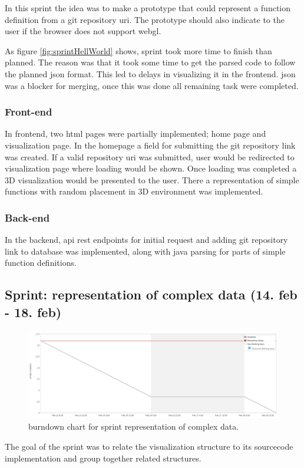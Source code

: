 In this sprint the idea was to make a prototype that could represent a function definition from a \gls{git} repository \gls{uri}. The prototype should also indicate to the user if the browser does not support \gls{webgl}.

As figure \ref{fig:sprintHellWorld} shows, sprint took more time to finish than planned. The reason was that it took some time to get the parsed code to follow the planned \gls{json} format. This led to delays in visualizing it in the \gls{frontend}. \Gls{json} was a blocker for merging, once this was done all remaining task were completed.

\subsubsection{Front-end}
In \gls{frontend}, two \gls{html} pages were partially implemented; home page and visualization page.
In the homepage a field for submitting the \gls{git} repository link was created. If a valid repository \gls{uri} was submitted, user would be redirected to visualization page where loading would be shown. Once loading was completed a 3D visualization would be presented to the user.
There a representation of simple functions with random placement in 3D environment was implemented.

\subsubsection{Back-end}
In the \gls{backend}, \gls{api} \gls{rest} endpoints for initial request and adding \gls{git} repository link to database was implemented, along with java parsing for parts of simple function definitions. 

\subsection{Sprint: representation of complex data (14. feb - 18. feb)}
\begin{figure}[H] 
    \includegraphics[width=\textwidth]{inc/images/sprints/sprintRepresentComplexData140219-180219.png}
    \caption{\Gls{burndown} chart for \gls{sprint} representation of complex data.}
    \label{fig:sprintRepresentationOfComplexData}
\end{figure}
The goal of the \gls{sprint} was to relate the visualization structure to its \gls{sourcecode} implementation and group together related structures.

